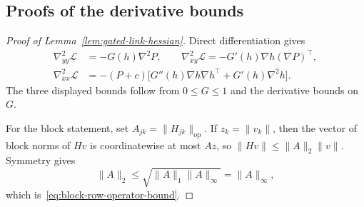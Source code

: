 \documentclass{article}
\theoremstyle{definition}
\newcommand{\op}{\mathrm{op}}
\begin{document}
\subsection{Proofs of the derivative bounds}

\begin{proof}[Proof of Lemma~\ref{lem:gated-link-hessian}]
Direct differentiation gives
\begin{align*}
 \nabla^2_{yy}\mathcal L
 &=-G(h)\nabla^2P,\qquad
 \nabla^2_{xy}\mathcal L
 =-G'(h)\nabla h(\nabla P)^\top,\\
 \nabla^2_{xx}\mathcal L
 &=-(P+c)\bigl[G''(h)\nabla h\nabla h^\top
                  +G'(h)\nabla^2h\bigr].
\end{align*}
The three displayed bounds follow from $0\le G\le1$ and the derivative
bounds on $G$.

For the block statement, set $A_{jk}=\|H_{jk}\|_{\op}$.  If
$z_k=\|v_k\|$, then the vector of block norms of $Hv$ is coordinatewise at
most $Az$, so $\|Hv\|\le\|A\|_2\|v\|$.  Symmetry gives
\begin{equation}
 \|A\|_2\le\sqrt{\|A\|_1\|A\|_\infty}=\|A\|_\infty,
\end{equation}
which is~\eqref{eq:block-row-operator-bound}.
\end{proof}
\end{document}
